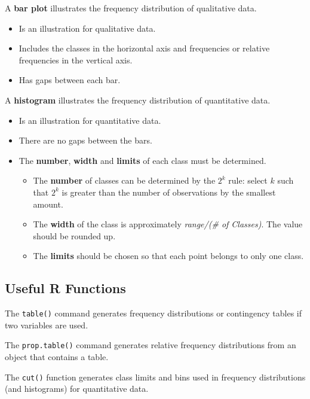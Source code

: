\documentclass[
  letterpaper,
  DIV=11,
  numbers=noendperiod]{scrreprt}
\providecommand{\tightlist}{%
  \setlength{\itemsep}{0pt}\setlength{\parskip}{0pt}}\usepackage{longtable,booktabs,array}
\begin{document}
A \textbf{bar plot} illustrates the frequency distribution of
qualitative data.

\begin{itemize}
\item
  Is an illustration for qualitative data.
\item
  Includes the classes in the horizontal axis and frequencies or
  relative frequencies in the vertical axis.
\item
  Has gaps between each bar.
\end{itemize}

A \textbf{histogram} illustrates the frequency distribution of
quantitative data.

\begin{itemize}
\item
  Is an illustration for quantitative data.
\item
  There are no gaps between the bars.
\item
  The \textbf{number}, \textbf{width} and \textbf{limits} of each class
  must be determined.

  \begin{itemize}
  \tightlist
  \item
    The \textbf{number} of classes can be determined by the \(2^k\)
    rule: select \(k\) such that \(2^k\) is greater than the number of
    observations by the smallest amount.
  \item
    The \textbf{width} of the class is approximately \emph{range/(\# of
    Classes)}. The value should be rounded up.
  \item
    The \textbf{limits} should be chosen so that each point belongs to
    only one class.
  \end{itemize}
\end{itemize}

\hypertarget{useful-r-functions-1}{%
\subsection*{Useful R Functions}\label{useful-r-functions-1}}

The \texttt{table()} command generates frequency distributions or
contingency tables if two variables are used.

The \texttt{prop.table()} command generates relative frequency
distributions from an object that contains a table.

The \texttt{cut()} function generates class limits and bins used in
frequency distributions (and histograms) for quantitative data.
\end{document}
